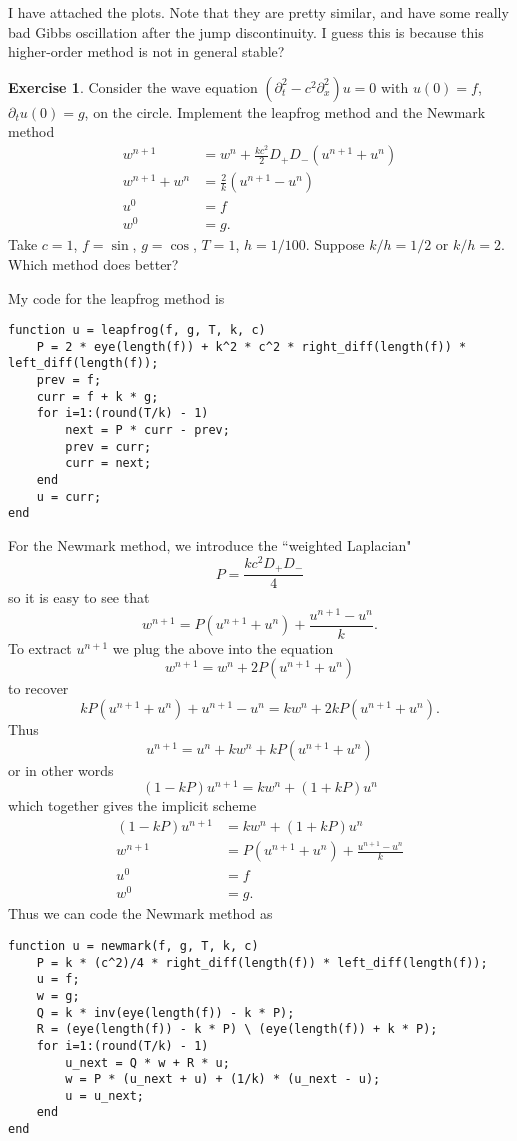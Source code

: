 \documentclass[10pt]{article}
\theoremstyle{definition}
\newtheorem{exer}{Exercise}
\begin{document}
I have attached the plots. Note that they are pretty similar, and have some really bad Gibbs oscillation after the jump discontinuity.
I guess this is because this higher-order method is not in general stable?

\begin{exer}
Consider the wave equation $(\partial_t^2 - c^2 \partial_x^2)u = 0$ with $u(0) = f$, $\partial_t u(0) = g$, on the circle.
Implement the leapfrog method and the Newmark method
\begin{align*}
w^{n+1} &= w^n + \frac{kc^2}{2} D_+ D_-(u^{n + 1} + u^n)\\
w^{n+1} + w^n &= \frac{2}{k}(u^{n + 1} - u^n)\\
u^0 &= f\\
w^0 &= g.
\end{align*}
Take $c = 1$, $f = \sin$, $g = \cos$, $T = 1$, $h = 1/100$.
Suppose $k/h = 1/2$ or $k/h = 2$.
Which method does better?
\end{exer}

My code for the leapfrog method is
\begin{verbatim}
function u = leapfrog(f, g, T, k, c)
    P = 2 * eye(length(f)) + k^2 * c^2 * right_diff(length(f)) * left_diff(length(f));
    prev = f;
    curr = f + k * g;
    for i=1:(round(T/k) - 1)
        next = P * curr - prev;
        prev = curr;
        curr = next;
    end
    u = curr;
end
\end{verbatim}
For the Newmark method, we introduce the ``weighted Laplacian"
$$P = \frac{kc^2 D_+ D_-}{4}$$
so it is easy to see that
$$w^{n + 1} = P(u^{n + 1} + u^n) + \frac{u^{n + 1} - u^n}{k}.$$
To extract $u^{n + 1}$ we plug the above into the equation
$$w^{n + 1} = w^n + 2P(u^{n + 1} + u^n)$$
to recover
$$kP(u^{n + 1} + u^n) + u^{n + 1} - u^n = kw^n + 2kP(u^{n + 1} + u^n).$$
Thus
$$u^{n + 1} = u^n + kw^n + kP(u^{n + 1} + u^n)$$
or in other words
$$(1 - kP)u^{n + 1} = kw^n + (1 + kP)u^n$$
which together gives the implicit scheme
\begin{align*}
(1 - kP)u^{n + 1} &= kw^n + (1 + kP)u^n \\
w^{n + 1} &= P(u^{n + 1} + u^n) + \frac{u^{n + 1} - u^n}{k}\\
u^0 &= f\\
w^0 &= g.
\end{align*}
Thus we can code the Newmark method as
\begin{verbatim}
function u = newmark(f, g, T, k, c)
    P = k * (c^2)/4 * right_diff(length(f)) * left_diff(length(f));
    u = f;
    w = g;
    Q = k * inv(eye(length(f)) - k * P);
    R = (eye(length(f)) - k * P) \ (eye(length(f)) + k * P);
    for i=1:(round(T/k) - 1)
        u_next = Q * w + R * u;
        w = P * (u_next + u) + (1/k) * (u_next - u);
        u = u_next;
    end
end
\end{verbatim}
\end{document}
